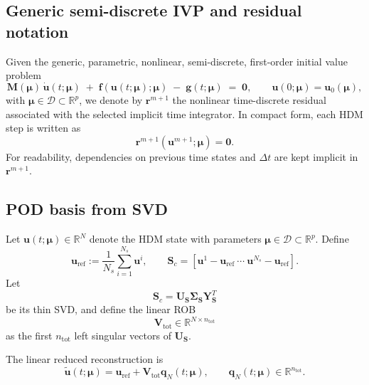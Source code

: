 \documentclass[11pt]{article}
\begin{document}
\subsection{Generic semi-discrete IVP and residual notation}
Given the generic, parametric, nonlinear, semi-discrete, first-order initial
value problem
\begin{equation}
\mathbf M(\bm\mu)\,\dot{\mathbf u}(t;\bm\mu)
\;+\;
\mathbf f\!\left(\mathbf u(t;\bm\mu);\bm\mu\right)
\;-\;
\mathbf g(t;\bm\mu)
\;=\;\mathbf 0,
\qquad
\mathbf u(0;\bm\mu)=\mathbf u_0(\bm\mu),
\label{eq:generic-ivp}
\end{equation}
with $\bm\mu\in\mathcal D\subset\mathbb R^p$, we denote by
$\mathbf r^{m+1}$ the nonlinear time-discrete residual associated with the
selected implicit time integrator. In compact form, each HDM step is written
as
\begin{equation}
\mathbf r^{m+1}\!\left(\mathbf u^{m+1};\bm\mu\right)=\mathbf 0.
\label{eq:generic-discrete-residual}
\end{equation}
For readability, dependencies on previous time states and $\Delta t$ are kept
implicit in $\mathbf r^{m+1}$.

\subsection{POD basis from SVD}
Let $\mathbf u(t;\bm\mu)\in\mathbb R^N$ denote the HDM state with parameters $\bm\mu\in\mathcal D\subset\mathbb R^p$. Define
\begin{equation}
\mathbf u_{\mathrm{ref}}:=\frac{1}{N_s}\sum_{i=1}^{N_s}\mathbf u^i,
\qquad
\mathbf S_c=[\mathbf u^1-\mathbf u_{\mathrm{ref}}\ \cdots\ \mathbf u^{N_s}-\mathbf u_{\mathrm{ref}}].
\end{equation}
Let
\begin{equation}
\mathbf S_c=\mathbf U_{\mathbf S}\mathbf\Sigma_{\mathbf S}\mathbf Y_{\mathbf S}^T
\end{equation}
be its thin SVD, and define the linear ROB
\begin{equation}
\mathbf V_{\mathrm{tot}}\in\mathbb R^{N\times n_{\mathrm{tot}}}
\end{equation}
as the first $n_{\mathrm{tot}}$ left singular vectors of $\mathbf U_{\mathbf S}$.

The linear reduced reconstruction is
\begin{equation}
\tilde{\mathbf u}(t;\bm\mu)=\mathbf u_{\mathrm{ref}}+\mathbf V_{\mathrm{tot}}\mathbf q_N(t;\bm\mu),
\qquad
\mathbf q_N(t;\bm\mu)\in\mathbb R^{n_{\mathrm{tot}}}.
\label{eq:linear-reconstruction}
\end{equation}
\end{document}

